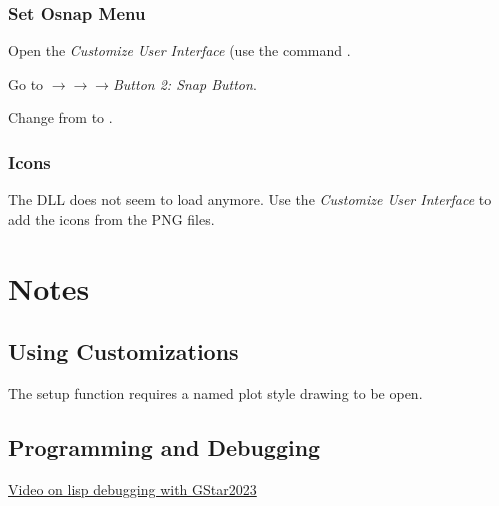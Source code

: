 \documentclass{lebook}
\begin{document}
\subsection{Set Osnap Menu}
\begin{numberedlist}
	\item Open the \textit{Customize User Interface} (use the command .
	\item Go to $\rightarrow$$\rightarrow$$\rightarrow$\textit{Button 2: Snap Button}.
	\item Change  from  to .
\end{numberedlist}

\subsection{Icons}
The DLL does not seem to load anymore.  Use the \textit{Customize User Interface} to add the icons from the PNG files.

\chapter{Notes}
\section{Using Customizations}
The setup function requires a named plot style drawing to be open.

\section{Programming and Debugging}
\begin{bulletedlist}
	\item \href{https://www.youtube.com/watch?v=Rrgx3TcXNzM}{Video on lisp debugging with GStar2023}
\end{bulletedlist}
\end{document}
